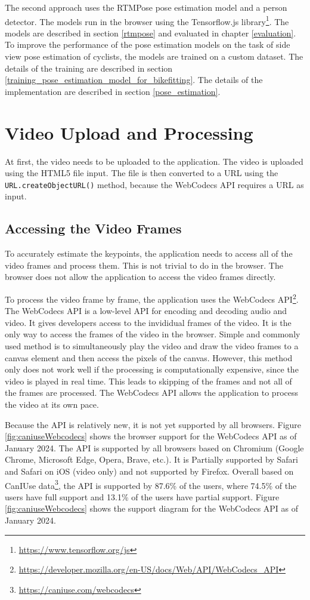 The second approach uses the RTMPose pose estimation model and a person detector. The models run in the browser using the Tensorflow.js library\footnote{\url{https://www.tensorflow.org/js}}. The models are described in section \ref{rtmpose} and evaluated in chapter \ref{evaluation}. To improve the performance of the pose estimation models on the task of side view pose estimation of cyclists, the models are trained on a custom dataset. The details of the training are described in section \ref{training_pose_estimation_model_for_bikefitting}. The details of the implementation are described in section \ref{pose_estimation}.


\section{Video Upload and Processing}
\label{video_upload_and_processing}
At first, the video needs to be uploaded to the application. The video is uploaded using the HTML5 file input. The file is then converted to a URL using the \texttt{URL.createObjectURL()} method, because the WebCodecs API requires a URL as input.

\subsection{Accessing the Video Frames}

To accurately estimate the keypoints, the application needs to access all of the video frames and process them. This is not trivial to do in the browser. The browser does not allow the application to access the video frames directly.

To process the video frame by frame, the application uses the WebCodecs API\footnote{\url{https://developer.mozilla.org/en-US/docs/Web/API/WebCodecs_API}}. The WebCodecs API is a low-level API for encoding and decoding audio and video. It gives developers access to the invididual frames of the video. It is the only way to access the frames of the video in the browser. Simple and commonly used method is to simultaneously play the video and draw the video  frames to a canvas element and then access the pixels of the canvas. However, this method only does not work well if the processing is computationally expensive, since the video is played in real time. This leads to skipping of the frames and not all of the frames are processed. The WebCodecs API allows the application to process the video at its own pace.

Because the API is relatively new, it is not yet supported by all browsers. Figure \ref{fig:caniuseWebcodecs} shows the browser support for the WebCodecs API as of January 2024. The API is supported by all browsers based on Chromium (Google Chrome, Microsoft Edge, Opera, Brave, etc.). It is Partially supported by Safari and Safari on iOS (video only) and not supported by Firefox. Overall based on CanIUse data\footnote{\url{https://caniuse.com/webcodecs}}, the API is supported by 87.6\% of the users, where 74.5\% of the users have full support and 13.1\% of the users have partial support. Figure \ref{fig:caniuseWebcodecs} shows the support diagram for the WebCodecs API as of January 2024.


